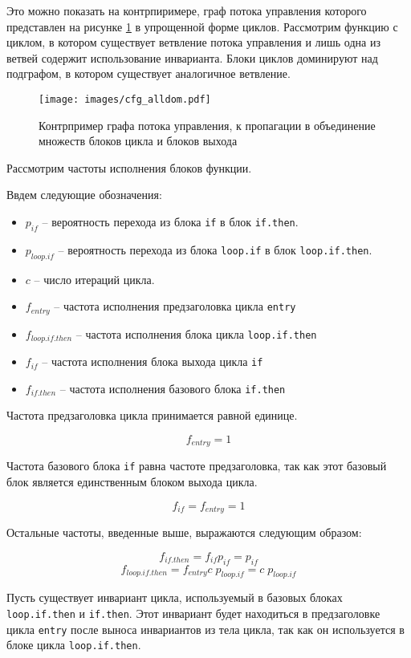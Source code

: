 Это можно показать на контрпиримере, граф потока управления которого представлен на рисунке \ref{fig:cfg_alldom} в упрощенной форме циклов.
Рассмотрим функцию с циклом, в котором существует ветвление потока управления и лишь одна из ветвей содержит использование инварианта.
Блоки циклов доминируют над подграфом, в котором существует аналогичное ветвление.

\begin{figure}
    \centering
    \texttt{[image: images/cfg\_alldom.pdf]}
    \caption{Контрпример графа потока управления, к пропагации в объединение множеств блоков цикла и блоков выхода}
    \label{fig:cfg_alldom}
\end{figure}

Рассмотрим частоты исполнения блоков функции.

Ввдем следующие обозначения:
\begin{itemize}
    \item $p_{if}$ -- вероятность перехода из блока \texttt{if} в блок \texttt{if.then}.
    \item $p_{loop.if}$ -- вероятность перехода из блока \texttt{loop.if} в блок \texttt{loop.if.then}.
    \item $c$ -- число итераций цикла.
    \item $f_{entry}$ -- частота исполнения предзаголовка цикла \texttt{entry}
    \item $f_{loop.if.then}$ -- частота исполнения блока цикла \texttt{loop.if.then}
    \item $f_{if}$ -- частота исполнения блока выхода цикла \texttt{if}
    \item $f_{if.then}$ -- частота исполнения базового блока \texttt{if.then}
\end{itemize}

Частота предзаголовка цикла принимается равной единице.

$$ f_{entry} = 1 $$

Частота базового блока \texttt{if} равна частоте предзаголовка, так как этот базовый блок является единственным блоком выхода цикла.

$$ f_{if} = f_{entry} = 1 $$

Остальные частоты, введенные выше, выражаются следующим образом:

$$ f_{if.then} = f_{if} p_{if} = p_{if} $$
$$ f_{loop.if.then} = f_{entry} c\; p_{loop.if} = c\; p_{loop.if} $$

Пусть существует инвариант цикла, используемый в базовых блоках \texttt{loop.if.then} и \texttt{if.then}.
Этот инвариант будет находиться в предзаголовке цикла \texttt{entry} после выноса инвариантов из тела цикла, так как он используется в блоке цикла \texttt{loop.if.then}.

